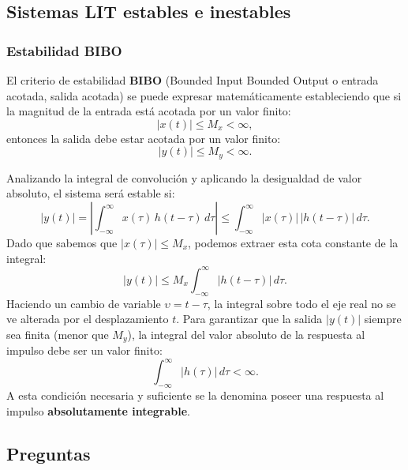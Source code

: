 \subsection{Sistemas LIT estables e inestables}

\subsubsection{Estabilidad BIBO}

El criterio de estabilidad \textbf{BIBO} (Bounded Input Bounded Output o entrada acotada, salida acotada) se puede expresar matemáticamente estableciendo que si la magnitud de la entrada está acotada por un valor finito:
\begin{equation}
	|x(t)| \leq M_{x} < \infty,
\end{equation}
entonces la salida debe estar acotada por un valor finito:
\begin{equation}
	|y(t)| \leq M_{y} < \infty.
\end{equation}

Analizando la integral de convolución y aplicando la desigualdad de valor absoluto, el sistema será estable si:
\begin{equation}
	|y(t)| = \left| \int_{-\infty }^{\infty } x(\tau) \, h(t-\tau) \, d\tau \right| \leq \int_{-\infty }^{\infty } |x(\tau)| \, |h(t-\tau)| \, d\tau .
\end{equation}
Dado que sabemos que $|x(\tau)| \leq M_x$, podemos extraer esta cota constante de la integral:
\begin{equation}
	|y(t)| \leq M_{x} \int_{-\infty }^{\infty } |h(t-\tau)| \, d\tau.
\end{equation}
Haciendo un cambio de variable $\upsilon = t - \tau$, la integral sobre todo el eje real no se ve alterada por el desplazamiento $t$. Para garantizar que la salida $|y(t)|$ siempre sea finita (menor que $M_y$), la integral del valor absoluto de la respuesta al impulso debe ser un valor finito:
\begin{equation}
	\int_{-\infty }^{\infty } |h(\tau)| \, d\tau < \infty.
\end{equation}
A esta condición necesaria y suficiente se la denomina poseer una respuesta al impulso \textbf{absolutamente integrable}.

\subsection{Preguntas}

